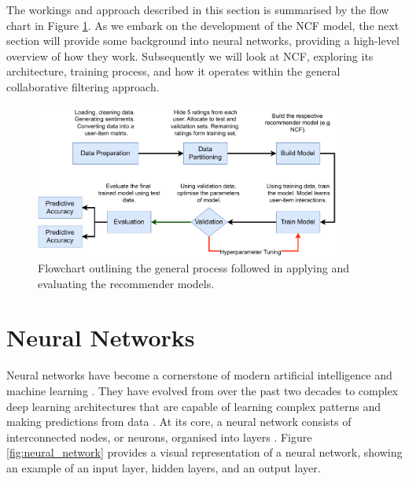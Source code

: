 The workings and approach described in this section is summarised by the flow chart in Figure \ref{fig:flowchart of process}. As we embark on the development of the NCF model, the next section will provide some background into neural networks, providing a high-level overview of how they work. Subsequently we will look at NCF, exploring its architecture, training process, and how it operates within the general collaborative filtering approach.

\begin{figure}[h]
    \centering
    \includegraphics[width=0.9\textwidth]{Figures/flowchart of model process-4.pdf} %
    \caption{Flowchart outlining the general process followed in applying and evaluating the recommender models.}
    \label{fig:flowchart of process}
  \end{figure}


\section{Neural Networks}
\label{sec:4 Neural Networks}

Neural networks have become a cornerstone of modern artificial intelligence and machine learning \cite{abdi1999neural}. They have evolved from over the past two decades to complex deep learning architectures that are capable of learning complex patterns and making predictions from data \cite{gurney2018introduction}. At its core, a neural network consists of interconnected nodes, or neurons, organised into layers \cite{abdi1999neural}. Figure \ref{fig:neural_network} provides a visual representation of a neural network, showing an example of an input layer, hidden layers, and an output layer.

